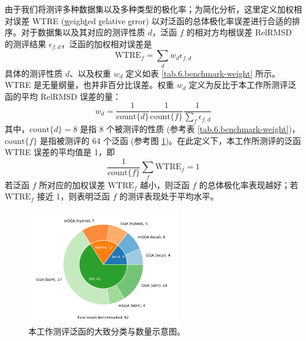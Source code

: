 由于我们将测评多种数据集以及多种类型的极化率；为简化分析，这里定义加权相对误差 WTRE (\underline{w}eigh\underline{t}ed \underline{r}elative \underline{e}rror) 以对泛函的总体极化率误差进行合适的排序。对于数据集以及其对应的测评性质 $d$，泛函 $f$ 的相对方均根误差 RelRMSD 的测评结果 $\epsilon_{f,d}$，泛函的加权相对误差是
\begin{equation}
    \label{eq.6.wtre}
    \mathrm{WTRE}_f = \sum_d w_d \epsilon_{f,d}
\end{equation}
具体的测评性质 $d$、以及权重 $w_d$ 定义如表 \ref{tab.6.benchmark-weight} 所示。WTRE 是无量纲量，也并非百分比误差。权重 $w_d$ 定义为反比于本工作所测评泛函的平均 RelRMSD 误差的量：
\begin{equation}
    w_d = \frac{1}{\mathrm{count} \{ d \}} \frac{1}{\mathrm{count} \{ f \}} \frac{1}{\displaystyle \sum_{f} \epsilon_{f,d}}
\end{equation}
其中，$\mathrm{count} \{ d \} = 8$ 是指 8 个被测评的性质 (参考表 \ref{tab.6.benchmark-weight})，$\mathrm{count} \{ f \}$ 是指被测评的 64 个泛函 (参考图 \ref{fig.6.pol-functionals-distribution})。在此定义下，本工作所测评的泛函 WTRE 误差的平均值是 1，即
\begin{equation*}
    \frac{1}{\mathrm{count} \{ f \}} \sum_f \mathrm{WTRE}_f = 1
\end{equation*}
若泛函 $f$ 所对应的加权误差 $\mathrm{WTRE}_f$ 越小，则泛函 $f$ 的总体极化率表现越好；若 $\mathrm{WTRE}_f$ 接近 1，则表明泛函 $f$ 的测评表现处于平均水平。

\begin{figure}[t]
    \centering
    \includegraphics[width=0.6\textwidth]{assets/pol-functionals-distribution.pdf}
    \caption{本工作测评泛函的大致分类与数量示意图。}
    \label{fig.6.pol-functionals-distribution}
\end{figure}


